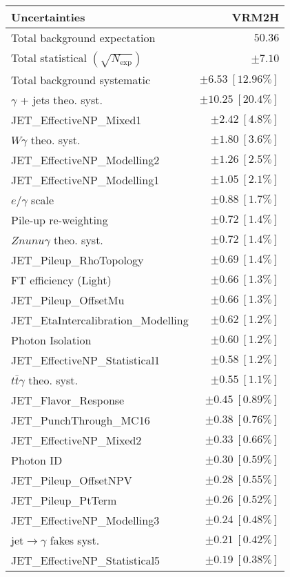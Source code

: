 \begin{tabular}{lr}
\hline
\textbf{Uncertainties} & \textbf{VRM2H} \\
\hline
Total background expectation & $50.36$ \\
\hline
Total statistical $(\sqrt{N_\mathrm{exp}})$ & $\pm 7.10$ \\
Total background systematic & $\pm 6.53\ [12.96\%]$ \\
\hline
\hline
$\gamma$ + jets theo. syst. & $\pm 10.25\ [20.4\%]$ \\
JET\_EffectiveNP\_Mixed1 & $\pm 2.42\ [4.8\%]$ \\
$W\gamma$ theo. syst. & $\pm 1.80\ [3.6\%]$ \\
JET\_EffectiveNP\_Modelling2 & $\pm 1.26\ [2.5\%]$ \\
JET\_EffectiveNP\_Modelling1 & $\pm 1.05\ [2.1\%]$ \\
$e/\gamma$ scale & $\pm 0.88\ [1.7\%]$ \\
Pile-up re-weighting & $\pm 0.72\ [1.4\%]$ \\
$Znunu\gamma$ theo. syst. & $\pm 0.72\ [1.4\%]$ \\
JET\_Pileup\_RhoTopology & $\pm 0.69\ [1.4\%]$ \\
FT efficiency (Light) & $\pm 0.66\ [1.3\%]$ \\
JET\_Pileup\_OffsetMu & $\pm 0.66\ [1.3\%]$ \\
JET\_EtaIntercalibration\_Modelling & $\pm 0.62\ [1.2\%]$ \\
Photon Isolation & $\pm 0.60\ [1.2\%]$ \\
JET\_EffectiveNP\_Statistical1 & $\pm 0.58\ [1.2\%]$ \\
$t\bar{t}\gamma$ theo. syst. & $\pm 0.55\ [1.1\%]$ \\
JET\_Flavor\_Response & $\pm 0.45\ [0.89\%]$ \\
JET\_PunchThrough\_MC16 & $\pm 0.38\ [0.76\%]$ \\
JET\_EffectiveNP\_Mixed2 & $\pm 0.33\ [0.66\%]$ \\
Photon ID & $\pm 0.30\ [0.59\%]$ \\
JET\_Pileup\_OffsetNPV & $\pm 0.28\ [0.55\%]$ \\
JET\_Pileup\_PtTerm & $\pm 0.26\ [0.52\%]$ \\
JET\_EffectiveNP\_Modelling3 & $\pm 0.24\ [0.48\%]$ \\
jet$\to\gamma$ fakes syst. & $\pm 0.21\ [0.42\%]$ \\
JET\_EffectiveNP\_Statistical5 & $\pm 0.19\ [0.38\%]$ \\

\end{tabular}
